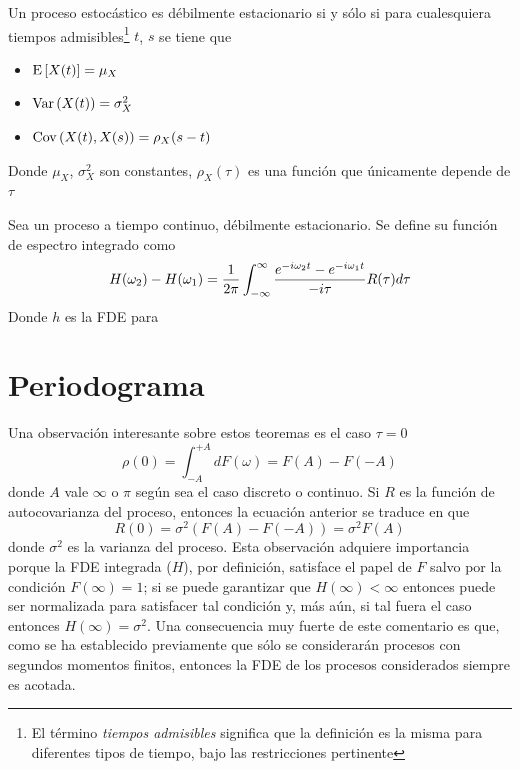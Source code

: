 \begin{definicion}
Un proceso estocástico \xt es débilmente estacionario si y sólo si para cualesquiera tiempos 
admisibles\footnote{El término \textit{tiempos admisibles} significa que la definición es la misma
para diferentes tipos de tiempo, bajo las restricciones pertinente} $t$, $s$ se tiene que
\begin{itemize}
\item $\mathrm{E}\left[ X(t) \right] = \mu_X$
\item $\mathrm{Var}\left( X(t) \right) = \sigma^{2}_X$
\item $\mathrm{Cov}\left( X(t),X(s) \right) = \rho_X (s-t)$
\end{itemize}
Donde $\mu_X$, $\sigma^{2}_X$ son constantes, $\rho_X(\tau)$ es una función que únicamente 
depende de $\tau$
\label{est_orden_primera}
\end{definicion}

\begin{definicion}
Sea \xt un proceso a tiempo continuo, débilmente estacionario. Se define su
función de espectro integrado como
\begin{equation*}
H(\omega_2) - H(\omega_1) = 
\frac{1}{2 \pi} \int_{-\infty}^{\infty} \frac{e^{- i \omega_2 t}-e^{- i \omega_1 t}}{- i \tau} R(\tau) d\tau
\end{equation*}
Donde $h$ es la FDE para \xt
\end{definicion}

\section{Periodograma}

Una observación interesante sobre estos teoremas es el caso $\tau = 0$
\begin{equation*}
\rho(0) = \int_{-A}^{+A} dF(\omega) = F(A) - F(-A)
\end{equation*}
donde $A$ vale $\infty$ o $\pi$ según sea el caso discreto o continuo. Si $R$ es la función de
autocovarianza del proceso, entonces la ecuación anterior se traduce en que
\begin{equation*}
R(0) = \sigma^{2} \left( F(A) - F(-A) \right) = \sigma^{2} F(A)
\end{equation*}
donde $\sigma^{2}$ es la varianza del proceso. 
Esta observación adquiere importancia porque la FDE integrada ($H$), por definición, satisface 
el papel de $F$ salvo por la condición $F(\infty)=1$; si se puede garantizar que 
$H(\infty)<\infty$ entonces puede ser normalizada para satisfacer tal condición y, más aún,
si tal fuera el caso entonces $H(\infty)=\sigma^{2}$. Una consecuencia muy fuerte de este 
comentario es que, como se ha establecido previamente que sólo se considerarán procesos con
segundos momentos finitos, entonces la FDE de los procesos considerados siempre es acotada.


